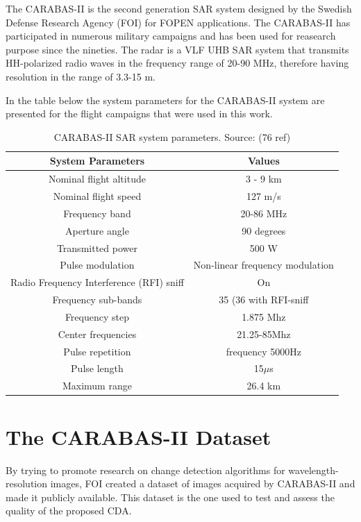 The CARABAS-II is the second generation SAR system designed by the Swedish Defense Research Agency (FOI) for FOPEN applications.
The CARABAS-II has participated in numerous military campaigns and has been used for reasearch purpose since the nineties.
The radar is a VLF UHB SAR system that transmits HH-polarized radio waves in the frequency range of 
20-90 MHz, therefore having resolution in the range of 3.3-15 m.

In the table below the system parameters for the CARABAS-II system are presented for the
flight campaigns that were used in this work. 

\begin{table}[h]
    \centering
    \begin{tabular}{|c|c|}
        \hline
        System Parameters & Values \\ \hline
        Nominal flight altitude & 3 - 9 km \\ \hline
        Nominal flight speed & 127 m/s \\ \hline
        Frequency band & 20-86 MHz \\ \hline
        Aperture angle & 90 degrees \\ \hline
        Transmitted power & 500 W \\ \hline
        Pulse modulation & Non-linear frequency modulation \\ \hline
        Radio Frequency Interference (RFI) sniff & On \\ \hline
        Frequency sub-bands & 35 (36 with RFI-sniff \\ \hline
        Frequency step & 1.875 Mhz \\ \hline
        Center frequencies & 21.25-85Mhz \\ \hline
        Pulse repetition & frequency 5000Hz \\ \hline
        Pulse length & 15$\mu$s \\ \hline
        Maximum range & 26.4 km \\ \hline
    \end{tabular}
    \caption{CARABAS-II SAR system parameters. Source: (76 ref)}
    \label{tab:carabas_system}
\end{table}

\section{The CARABAS-II Dataset}

By trying to promote research on change detection algorithms for wavelength-resolution
images, FOI created a dataset of images acquired by CARABAS-II and made it publicly available. 
This dataset is the one used to test and assess the quality of the proposed CDA.

